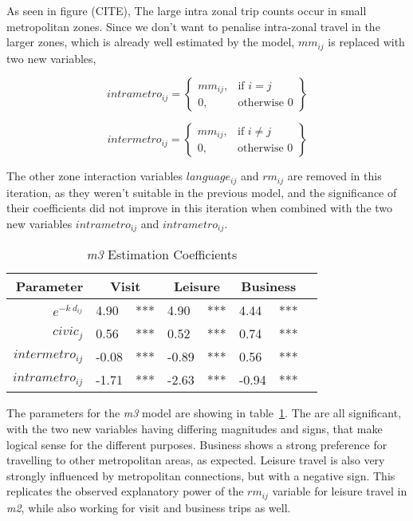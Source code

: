 As seen in figure (CITE), The large intra zonal trip counts occur in small metropolitan zones. Since we don't want to penalise intra-zonal travel in the larger zones, which is already well estimated by the model,  $mm_{ij}$  is replaced with two new variables,

	$$	
	intrametro_{ij} = \left.
  \begin{cases}
    mm_{ij}, & \text{if } i = j \\
    0, & \text{otherwise } 0 
  \end{cases}
  \right\}
	$$
  
	$$	
	intermetro_{ij} = \left.
  \begin{cases}
    mm_{ij}, & \text{if } i \neq j \\
    0, & \text{otherwise } 0 
  \end{cases}
  \right\}
	$$
	
The other zone interaction variables $language_{ij}$  and $rm_{ij}$  are removed in this iteration, as they weren't suitable in the previous model, and the significance of their coefficients did not improve in this iteration when combined with the two new variables $intrametro_{ij}$ and $intrametro_{ij}$. 

\begin{table}[H]
\centering
\caption{\textit{m3} Estimation Coefficients}
\label{table:m3-coeff}
\begin{tabular}{@{}rlrlrlrl@{}}
  \toprule
 Parameter & \multicolumn{2}{c}{Visit} & \multicolumn{2}{c}{Leisure} & \multicolumn{2}{c}{Business} &  \\ \midrule
  $e^{-k\ d_{ij}}$ 	& 4.90 	& *** & 4.90 & *** & 4.44 & *** \\ 
  $civic_j$ & 0.56 	& *** 	& 0.52 & *** & 0.74 & *** \\ 
  $intermetro_{ij}$ & -0.08 & *** & -0.89 & *** & 0.56 & *** \\ 
  $intrametro_{ij}$ & -1.71 & *** & -2.63 & *** & -0.94 & *** \\ 
   \bottomrule
\end{tabular}
\end{table}

The parameters for the \textit{m3} model are showing in table~\ref{table:m3-coeff}. The are all significant, with the two new variables having differing magnitudes and signs, that make logical sense for the different purposes. Business shows a strong preference for travelling to other metropolitan areas, as expected. Leisure travel is also very strongly influenced by metropolitan connections, but with a negative sign. This replicates the observed explanatory power of the $rm_{ij}$ variable for leisure travel in \textit{m2}, while also working for visit and business trips as well.

